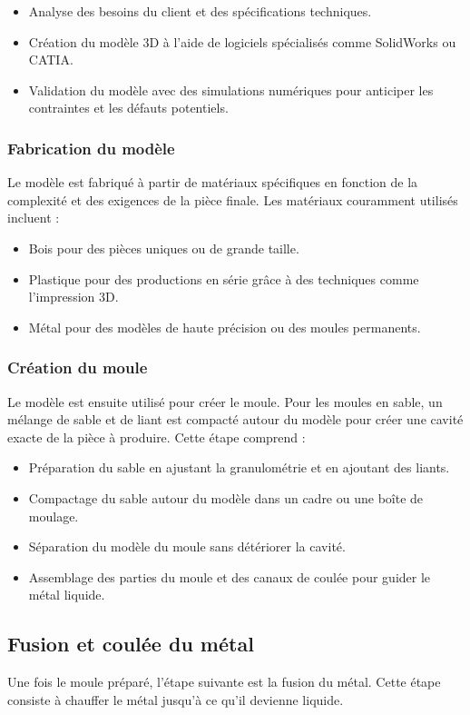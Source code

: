 \documentclass[12pt]{article}
\begin{document}
\begin{itemize}
    \item Analyse des besoins du client et des spécifications techniques.
    \item Création du modèle 3D à l'aide de logiciels spécialisés comme SolidWorks ou CATIA.
    \item Validation du modèle avec des simulations numériques pour anticiper les contraintes et les défauts potentiels.
\end{itemize}

\subsubsection{Fabrication du modèle}
Le modèle est fabriqué à partir de matériaux spécifiques en fonction de la complexité et des exigences de la pièce finale. Les matériaux couramment utilisés incluent :

\begin{itemize}
    \item Bois pour des pièces uniques ou de grande taille.
    \item Plastique pour des productions en série grâce à des techniques comme l'impression 3D.
    \item Métal pour des modèles de haute précision ou des moules permanents.
\end{itemize}

\subsubsection{Création du moule}
Le modèle est ensuite utilisé pour créer le moule. Pour les moules en sable, un mélange de sable et de liant est compacté autour du modèle pour créer une cavité exacte de la pièce à produire. Cette étape comprend :

\begin{itemize}
    \item Préparation du sable en ajustant la granulométrie et en ajoutant des liants.
    \item Compactage du sable autour du modèle dans un cadre ou une boîte de moulage.
    \item Séparation du modèle du moule sans détériorer la cavité.
    \item Assemblage des parties du moule et des canaux de coulée pour guider le métal liquide.
\end{itemize}

\subsection{Fusion et coulée du métal}
Une fois le moule préparé, l'étape suivante est la fusion du métal. Cette étape consiste à chauffer le métal jusqu'à ce qu'il devienne liquide.
\end{document}
